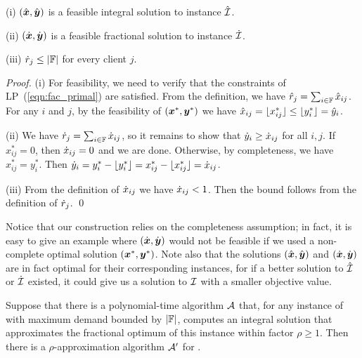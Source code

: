 \documentclass{llncs}
\begin{document}

\begin{lemma}\label{lem: polynomial demands partition}
{\rm (i)}
  $(\hat{\boldsymbol{x}}, \hat{\boldsymbol{y}})$ is a feasible integral solution to
  instance ${\hat{\cal I}}$.

\noindent
{\rm (ii)}
  $(\dot{\boldsymbol{x}}, \dot{\boldsymbol{y}})$ is a feasible fractional
  solution to instance ${\dot{\cal I}}$.

\noindent
{\rm (iii)}
${\dot r}_j\leq |\mathbb{F}|$ for every client $j$.

\end{lemma}

\begin{proof}
(i) For feasibility, we need to verify that the constraints of LP~(\ref{eqn:fac_primal})
are satisfied. From the definition, we have ${\hat r}_j = \sum_{i\in\mathbb{F}} {\hat x}_{ij}$.
For any $i$ and $j$, by the feasibility of $(\boldsymbol{x}^\ast,\boldsymbol{y}^\ast)$ we have
${\hat x}_{ij} = { \lfloor x_{ij}^\ast \rfloor } \le { \lfloor y^\ast_i \rfloor } = {\hat y}_i$.

(ii) We have  ${\dot r}_j = \sum_{i\in\mathbb{F}} {\dot x}_{ij}$, so
it remains to show that ${\dot y}_i \geq {\dot x}_{ij}$ for all $i,j$. 
If $x_{ij}^\ast=0$, then ${\dot x}_{ij}=0$ and we are done. 
Otherwise, by completeness, we have $x_{ij}^\ast=y_i^\ast$. 
Then  ${\dot y}_i = y_i^\ast - { \lfloor y_i^\ast \rfloor } = x_{ij}^\ast - { \lfloor x_{ij}^\ast \rfloor } ={\dot x}_{ij}$. 

(iii) From the definition of ${\dot x}_{ij}$ we have
  ${\dot x}_{ij} < 1$.  Then the bound follows from the definition of ${\dot r}_j$.
\qed
\end{proof}

Notice that our construction relies on the completeness assumption; in
fact, it is easy to give an example where $(\dot{\boldsymbol{x}}, \dot{\boldsymbol{y}})$ would
not be feasible if we used a non-complete optimal solution
$(\boldsymbol{x}^\ast,\boldsymbol{y}^\ast)$.  Note also that the solutions
$(\hat{\boldsymbol{x}},\hat{\boldsymbol{y}})$ and $(\dot{\boldsymbol{x}}, \dot{\boldsymbol{y}})$ are in fact optimal for
their corresponding instances, for if a better solution to ${\hat{\cal I}}$
or ${\dot{\cal I}}$ existed, it could give us a solution to $\mathcal{I}$ with a
smaller objective value.


\begin{theorem}\label{thm: reduction to polynomial}
  Suppose that there is a polynomial-time algorithm ${\cal A}$
  that, for any instance of {\FTFP} with maximum demand
  bounded by $|\mathbb{F}|$, computes an integral solution
  that approximates the fractional optimum of this instance
  within factor $\rho\geq 1$.  Then there is a
  $\rho$-approximation algorithm ${\cal A}'$ for {\FTFP}.
\end{theorem}
\end{document}
